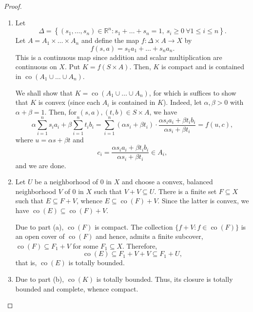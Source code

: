 \documentclass[11pt]{article}
\theoremstyle{thmstyle}
\theoremstyle{defstyle}
\newcommand{\R}{\mathbb{R}}
\renewcommand{\le}{\leqslant}
\renewcommand{\ge}{\geqslant}
\newcommand{\co}{\operatorname{co}}
\begin{document}
\begin{proof}
\begin{enumerate}[label=(\alph*)]
    \item Let 
    \begin{equation*}
        \Delta = \left\{(s_1,\dots,s_n)\in\R^n\colon s_1 + \dots + s_n = 1,~s_i\ge 0~\forall 1\le i\le n\right\}.
    \end{equation*}
    Let $A = A_1\times\dots\times A_n$ and define the map $f: \Delta\times A\to X$ by 
    \begin{equation*}
        f(s, a) = s_1a_1 + \dots + s_na_n.
    \end{equation*}
    This is a continuous map since addition and scalar multiplication are continuous on $X$. Put $K = f(S\times A)$. Then, $K$ is compact and is contained in $\co(A_1\cup\dots\cup A_n)$.

    We shall show that $K = \co(A_1\cup\dots\cup A_n)$, for which is suffices to show that $K$ is convex (since each $A_i$ is contained in $K$). Indeed, let $\alpha,\beta > 0$ with $\alpha + \beta = 1$. Then, for $(s, a), (t, b)\in S\times A$, we have 
    \begin{equation*}
        \alpha\sum_{i = 1}^n s_ia_i + \beta\sum_{i = 1}^n t_ib_i = \sum_{i = 1}^n (\alpha s_i + \beta t_i)\cdot\frac{\alpha s_ia_i + \beta t_ib_i}{\alpha s_i + \beta t_i} = f(u, c),
    \end{equation*}
    where $u = \alpha s + \beta t$ and 
    \begin{equation*}
        c_i = \frac{\alpha s_ia_i + \beta t_ib_i}{\alpha s_i + \beta t_i}\in A_i,
    \end{equation*}
    and we are done.

    \item Let $U$ be a neighborhood of $0$ in $X$ and choose a convex, balanced neighborhood $V$ of $0$ in $X$ such that $V + V\subseteq U$. There is a finite set $F\subseteq X$ such that $E\subseteq F+ V$, whence $E\subseteq\co(F) + V$. Since the latter is convex, we have $\co(E)\subseteq \co(F) + V$.

    Due to part (a), $\co(F)$ is compact. The collection $\{f + V\colon f\in\co(F)\}$ is an open cover of $\co(F)$ and hence, admits a finite subcover, $\co(F)\subseteq F_1 + V$ for some $F_1\subseteq X$. Therefore, 
    \begin{equation*}
        \co(E)\subseteq F_1 + V + V\subseteq F_1 + U,
    \end{equation*}
    that is, $\co(E)$ is totally bounded.

    \item Due to part (b), $\co(K)$ is totally bounded. Thus, its closure is totally bounded and complete, whence compact. \qedhere
\end{enumerate}
\end{proof}
\end{document}
